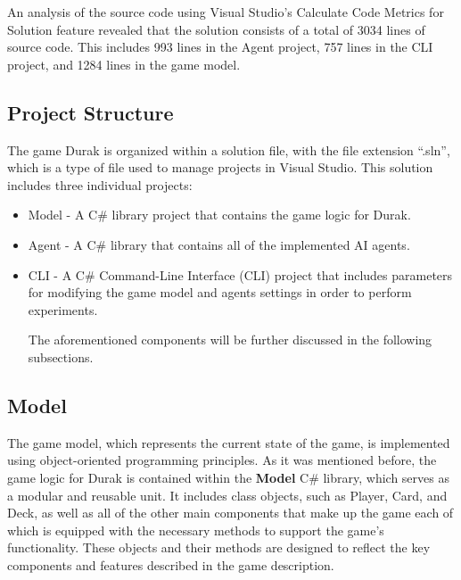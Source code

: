 An analysis of the source code using Visual Studio's Calculate Code Metrics for Solution feature revealed that the solution consists of a total of 3034 lines of source code. This includes 993 lines in the Agent project, 757 lines in the CLI project, and 1284 lines in the game model.

\subsection{Project Structure}
The game Durak is organized within a solution file, with the file extension ``.sln'', which is a type of file used to manage projects in Visual Studio. This solution includes three individual projects: 

\begin{itemize}

\item Model - A C\# library project that contains the game logic for Durak.

\item Agent - A C\# library that contains all of the implemented AI agents.

\item CLI - A C\# Command-Line Interface (CLI) project that includes parameters for modifying the game model and agents settings in order to perform experiments.

The aforementioned components will be further discussed in the following subsections.

\end{itemize}

\subsection{Model}

The game model, which represents the current state of the game, is implemented using object-oriented programming principles. As it was mentioned before, the game logic for Durak is contained within the \textbf{Model} C\# library, which serves as a modular and reusable unit. It includes class objects, such as Player, Card, and Deck, as well as all of the other main components that make up the game each of which is equipped with the necessary methods to support the game's functionality. These objects and their methods are designed to reflect the key components and features described in the game description.

